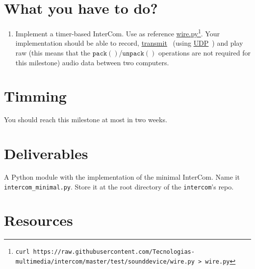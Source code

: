 \section{What you have to do?}

\begin{enumerate}

\item Implement a timer-based InterCom. Use as reference
  \href{https://github.com/Tecnologias-multimedia/intercom/blob/master/test/sounddevice/wire.py}{wire.py}\footnote{
  \texttt{curl
    https://raw.githubusercontent.com/Tecnologias-multimedia/intercom/master/test/sounddevice/wire.py
    > wire.py} }. Your implementation should be able to record,
  \href{https://github.com/vicente-gonzalez-ruiz/YAPT/blob/master/03-IO/networking/sockets.ipynb}{transmit}~\cite{YAPT}
  (using
  \href{https://en.wikipedia.org/wiki/User_Datagram_Protocol}{UDP}~\cite{UDP})
  and play raw (this means that the
  $\mathtt{pack()}$/$\mathtt{unpack()}$ operations are not required for
    this milestone) audio data between two computers.
  
\end{enumerate}

\section{Timming}

You should reach this milestone at most in two weeks.

\section{Deliverables}

A Python module with the implementation of the minimal InterCom. Name
it \texttt{intercom\_minimal.py}. Store it at the root directory of
the \texttt{intercom}'s repo.

\section{Resources}


